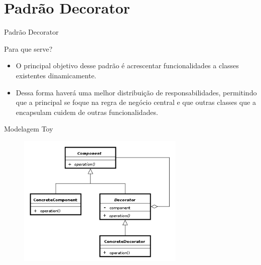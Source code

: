 \section{Padrão Decorator}

\begin{frame}{Padrão Decorator}{}
\begin{block}{Para que serve?}
  \begin{itemize}
    \item<1-> O principal objetivo desse padrão é acrescentar funcionalidades a classes existentes dinamicamente.
    \item<1-> Dessa forma haverá uma melhor distribuição de responsabilidades, permitindo que a principal se foque na regra de negócio central e que outras classes que a encapsulam cuidem de outras funcionalidades.
  \end{itemize}
\end{block}
\end{frame}

\begin{frame}{Modelagem Toy}
\begin{block}{}
  \begin{figure}
    \includegraphics[width=8cm]{figuras/uml_decorator}
  \end{figure}
\end{block}
\end{frame}
